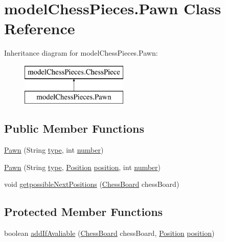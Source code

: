 \hypertarget{classmodel_chess_pieces_1_1_pawn}{\section{model\+Chess\+Pieces.\+Pawn Class Reference}
\label{classmodel_chess_pieces_1_1_pawn}
}
Inheritance diagram for model\+Chess\+Pieces.\+Pawn\+:\begin{figure}[H]
\begin{center}
\leavevmode
\includegraphics[height=2.000000cm]{classmodel_chess_pieces_1_1_pawn}
\end{center}
\end{figure}
\subsection*{Public Member Functions}
\begin{DoxyCompactItemize}
\item 
\hyperlink{classmodel_chess_pieces_1_1_pawn_a7621de9604258a4ec1c58480b1655564}{Pawn} (String \hyperlink{classmodel_chess_pieces_1_1_chess_piece_a195487ca88c197af7c1604247be31db2}{type}, int \hyperlink{classmodel_chess_pieces_1_1_chess_piece_a979e63b99128333883acedc38d25dc87}{number})
\item 
\hyperlink{classmodel_chess_pieces_1_1_pawn_afcf3ca5e22f454c225ca2240af0f4519}{Pawn} (String \hyperlink{classmodel_chess_pieces_1_1_chess_piece_a195487ca88c197af7c1604247be31db2}{type}, \hyperlink{classmodel_core_1_1_position}{Position} \hyperlink{classmodel_chess_pieces_1_1_chess_piece_a3d4362d5b28f6edb14161196d9c6807d}{position}, int \hyperlink{classmodel_chess_pieces_1_1_chess_piece_a979e63b99128333883acedc38d25dc87}{number})
\item 
void \hyperlink{classmodel_chess_pieces_1_1_pawn_ab63cd8cb6cf803d2f57c4cc08ffcb96f}{getpossible\+Next\+Positions} (\hyperlink{classmodel_core_1_1_chess_board}{Chess\+Board} chess\+Board)
\end{DoxyCompactItemize}
\subsection*{Protected Member Functions}
\begin{DoxyCompactItemize}
\item 
boolean \hyperlink{classmodel_chess_pieces_1_1_pawn_adf484645070f9dd3a774ea779aa84260}{add\+If\+Avaliable} (\hyperlink{classmodel_core_1_1_chess_board}{Chess\+Board} chess\+Board, \hyperlink{classmodel_core_1_1_position}{Position} \hyperlink{classmodel_chess_pieces_1_1_chess_piece_a3d4362d5b28f6edb14161196d9c6807d}{position})
\end{DoxyCompactItemize}
